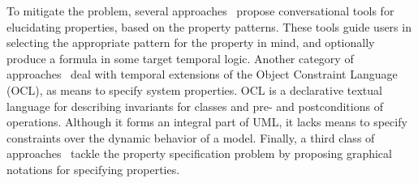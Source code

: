 \documentclass[letter]{llncs}
\begin{document}
To mitigate the problem, several approaches~\cite{Smith02propel:an,konrad2005facilitating,Mondragon_prospec} propose conversational tools for
elucidating properties, based on the property patterns. These tools guide users in selecting the appropriate pattern
for the property in mind, and optionally produce a formula in some target temporal logic. 
Another category of approaches~\cite{Ziemann02anextension,Flake03formalsemantics,Ackermann:2006:LOS:2135315.2135339} deal with temporal extensions 
of the Object Constraint Language (OCL), as means to specify system
properties. OCL is a declarative textual language for describing invariants for
classes and pre- and postconditions of operations. Although it forms an integral
part of UML, it lacks means to specify constraints over the dynamic behavior
of a model. Finally, a third class of approaches~\cite{Autili:2007:GSS:1290845.1290859,Lee97agraphical,Smith:2001:ECG:882477.883639,Knapp:2006:MCU:1762828.1762836,Lilius99vuml:a,Kugler:2005:TLS:2140653.2140692,MVPSA} tackle the property
specification problem by proposing graphical notations for specifying properties.
\end{document}
